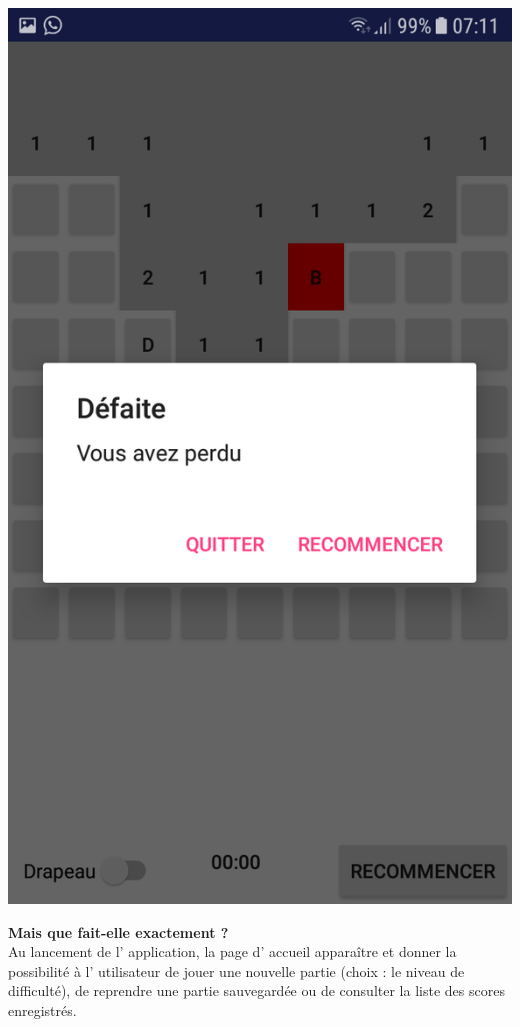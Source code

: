 \documentclass{article}
\begin{document}
\begin{center}
   \includegraphics[scale=0.12]{3.png}
\end{center}

\textbf {Mais que fait-elle exactement ?} \\
	Au lancement de l’ application, la page d’ accueil apparaître et donner la
possibilité à l' utilisateur de jouer une nouvelle partie (choix : le niveau de difficulté), de reprendre une partie sauvegardée ou de consulter la liste des scores enregistrés.
\end{document}
